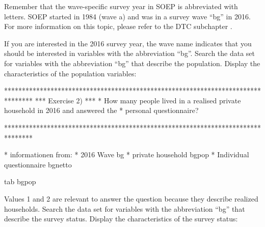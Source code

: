\documentclass[letterpaper,10pt,openany,onesideH,english]{sphinxmanual}
\begin{document}
\begin{figure}[H]
\centering

\noindent{}
\end{figure}


Remember that the wave-specific survey year in SOEP is abbreviated with letters. SOEP started in 1984 (wave a) and was in a survey wave “bg” in 2016. For more information on this topic, please refer to the DTC subchapter {\hyperref[\detokenize{Principles of Data Structure/index:label}]{}}.

If you are interested in the 2016 survey year, the wave name indicates that you should be interested in variables with the abbreviation “bg”.
Search the data set for variables with the abbreviation “bg” that describe the population. Display the characteristics of the population variables:

%
\begin{sphinxVerbatim}[commandchars=\\\{\},numbers=left,firstnumber=1,stepnumber=1]
********************************************************************************
*** Exercise 2) ***
* How many people lived in a realised private household in 2016 and answered the 
* personal questionnaire?

********************************************************************************

* informationen from:
* 2016 \PYGZhy{}\PYGZgt{} Wave bg
* private household \PYGZhy{}\PYGZgt{} bgpop
* Individual questionnaire \PYGZhy{}\PYGZgt{} bgnetto

tab bgpop
\end{sphinxVerbatim}

\begin{figure}[H]
\centering

\noindent{}
\end{figure}

Values 1 and 2 are relevant to answer the question because they describe realized households. Search the data set for variables with the abbreviation “bg” that describe the survey status. Display the characteristics of the survey status:

%
\begin{sphinxVerbatim}[commandchars=\\\{\},numbers=left,firstnumber=1,stepnumber=1]
 
\end{sphinxVerbatim}
\end{document}
